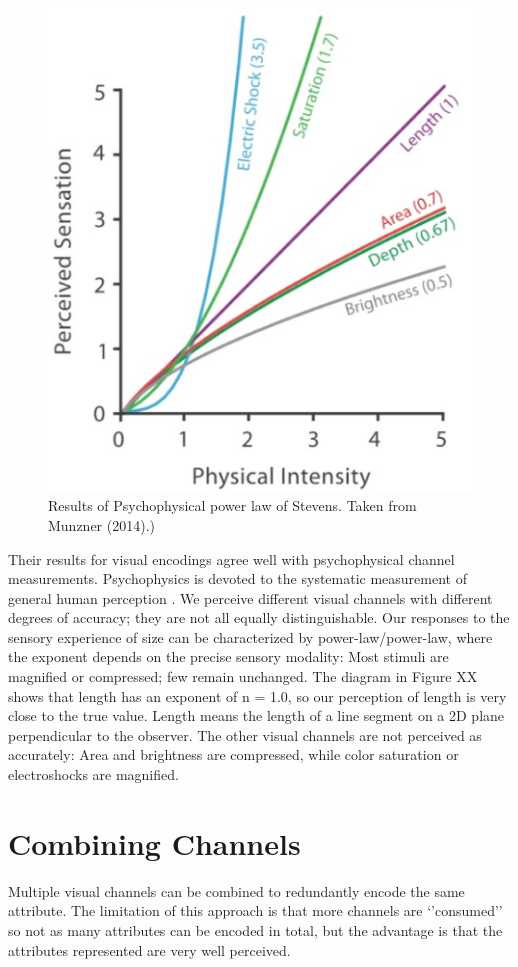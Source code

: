 \documentclass[
]{book}
\begin{document}
\begin{figure}

{\centering \includegraphics[width=0.5\linewidth]{images/stevens_psychophysicalpowerlaw} 

}

\caption{Results of Psychophysical power law of Stevens. Taken from Munzner (2014).)}\label{fig:unnamed-chunk-10}
\end{figure}

Their results for visual encodings agree well with psychophysical channel measurements. Psychophysics is devoted to the systematic measurement of general human perception \citep{StevensMarks2017Psychophysics}. We perceive different visual channels with different degrees of accuracy; they are not all equally distinguishable. Our responses to the sensory experience of size can be characterized by power-law/power-law, where the exponent depends on the precise sensory modality: Most stimuli are magnified or compressed; few remain unchanged. The diagram in Figure XX shows that length has an exponent of n = 1.0, so our perception of length is very close to the true value. Length means the length of a line segment on a 2D plane perpendicular to the observer. The other visual channels are not perceived as accurately: Area and brightness are compressed, while color saturation or electroshocks are magnified.

\hypertarget{combining-channels}{%
\section{Combining Channels}\label{combining-channels}}

Multiple visual channels can be combined to redundantly encode the same attribute. The limitation of this approach is that more channels are `'consumed'' so not as many attributes can be encoded in total, but the advantage is that the attributes represented are very well perceived.
\end{document}

